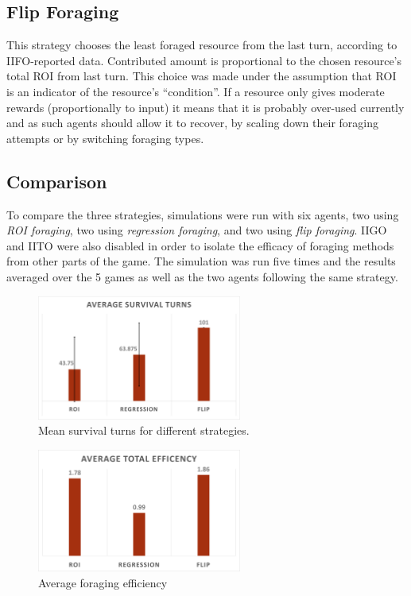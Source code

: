 \subsection{Flip Foraging}

This strategy chooses the least foraged resource from the last turn, according to IIFO-reported data. Contributed amount is proportional to the chosen resource's total ROI from last turn. This choice was made under the assumption that ROI is an indicator of the resource's ``condition''. If a resource only gives moderate rewards (proportionally to input) it means that it is probably over-used currently and as such agents should allow it to recover, by scaling down their foraging attempts or by switching foraging types.

\subsection{Comparison}

To compare the three strategies, simulations were run with six agents, two using \emph{ROI foraging}, two using \emph{regression foraging}, and two using \emph{flip foraging}. IIGO and IITO were also disabled in order to isolate the efficacy of foraging methods from other parts of the game. The simulation was run five times and the results averaged over the 5 games as well as the two agents following the same strategy.

\begin{figure}[H] 
\centering
\includegraphics[width=0.6\textwidth]{09_team1_agentdesign/images/mean_survival_turns}
\caption{Mean survival turns for different strategies.}
\label{fig:team1:mean_survival}
\end{figure} 

\begin{figure}[H] 
\centering
\includegraphics[width=0.6\textwidth]{09_team1_agentdesign/images/total_efficiency}
\caption{Average foraging efficiency}
\label{fig:team1:average_efficiency}
\end{figure} 

